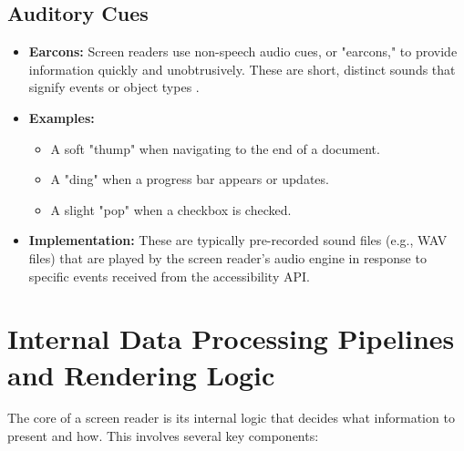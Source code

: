 \subsection{Auditory Cues}
\label{sub:auditory-cues}

\begin{itemize}
	\item \textbf{Earcons:} Screen readers use non-speech audio cues, or "earcons," to provide information quickly and unobtrusively. These are short, distinct sounds that signify events or object types \cite{Grunwald1999AuditoryLatency}.
	\item \textbf{Examples:}
	      \begin{itemize}
		      \item A soft "thump" when navigating to the end of a document.
		      \item A "ding" when a progress bar appears or updates.
		      \item A slight "pop" when a checkbox is checked.
	      \end{itemize}
	\item \textbf{Implementation:} These are typically pre-recorded sound files (e.g., WAV files) that are played by the screen reader's audio engine in response to specific events received from the accessibility API.
\end{itemize}

\section{Internal Data Processing Pipelines and Rendering Logic}
\label{sec:internal-data-processing-pipelines-and-rendering-logic}

The core of a screen reader is its internal logic that decides what information to present and how. This involves several key components:

